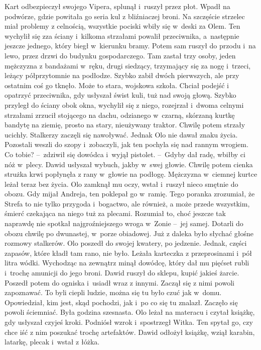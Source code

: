 \documentclass[../MAIN.tex]{subfiles}
\begin{document}
\mm Kart odbezpieczył swojego Vipera, splunął i~ruszył przez płot. Wpadł na
podwórze, gdzie powitała go seria kul z bliźniaczej broni. Na szczęście strzelec
miał problemy z celnością, wszystkie pociski wbiły się w~deski za Olem. Ten
wychylił się zza ściany i~kilkoma strzałami powalił przeciwnika, a~następnie
jeszcze jednego, który biegł w~kierunku bramy. Potem sam ruszył do przodu i~na
lewo, przez drzwi do budynku gospodarczego.
Tam zastał trzy osoby, jeden
mężczyzna z bandażami w~ręku, drugi siedzący, trzymający się za nogę i~trzeci,
leżący półprzytomnie na podłodze. Szybko zabił dwóch pierwszych, ale przy
ostatnim coś go tknęło.
Może to stara, wojskowa szkoła. Chciał podejść i
opatrzyć przeciwnika, gdy usłyszał świst kuli, tuż nad swoją głową. Szybko
przyległ do ściany obok okna, wychylił się z niego, rozejrzał i~dwoma celnymi
strzałami zrzucił stojącego na dachu, odzianego w~czarną, skórzaną kurtkę
bandytę na ziemię, prosto na stary, nieużywany traktor.
\pp
Chwilę potem strzały ucichły. Stalkerzy zaczęli się nawoływać. Jednak Olo nie
dawał znaku życia. Pozostali weszli do szopy i~zobaczyli, jak ten pochyla się
nad rannym wrogiem.
\dd
\sd
\xx
Co tobie? --~zdziwił się dowódca i~wyjął pistolet. --~Gdyby dał radę,
wbiłby ci nóż w~plecy.
\qd
\dd
\mm Dawid usłyszał wybuch, jakby w~swej głowie. Chwilę potem cienka strużka krwi
popłynęła z rany w~głowie na podłogę. Mężczyzna w~ciemnej kurtce leżał teraz bez
życia. Olo zamknął mu oczy, wstał i~ruszył nieco smętnie do obozu. Gdy mijał
Andreja, ten poklepał go w~ramię.
\pp
Tego poranka zrozumiał, że Strefa to nie tylko przygoda i~bogactwo, ale również,
a może przede wszystkim, śmierć czekająca na niego tuż za plecami. Rozumiał to,
choć jeszcze tak naprawdę nie spotkał najgroźniejszego wroga w~Zonie --~jej
samej.
\pp
Dotarli do obozu chwilę po dwunastej, w~porze obiadowej. Już z daleka było
słychać głośne rozmowy stalkerów. Olo poszedł do swojej kwatery, po jedzenie.
Jednak, części zapasów, które kładł tam rano, nie było.
Leżała karteczka z
przeprosinami i~pół litra wódki. Wychodząc na zewnątrz minął dowódcę, który dał
mu pięćset rubli i~trochę amunicji do jego broni.
\pp
Dawid ruszył do sklepu, kupić jakieś żarcie. Poszedł potem do ogniska i~usiadł
wraz z
innymi. Zaczął się z nimi powoli zapoznawać. To byli ciepli ludzie, można się tu
było czuć jak w~domu. Opowiedział, kim jest, skąd pochodzi, jak i~po co się tu
znalazł.
\pp
Zaczęło się powoli ściemniać. Była godzina szesnasta. Olo leżał na materacu i
czytał książkę, gdy usłyszał czyjeś kroki. Podniósł wzrok i~spostrzegł Witka.
Ten spytał go, czy chce iść z nim poszukać trochę artefaktów. Dawid odłożył
książkę, wziął karabin, latarkę, plecak i~wstał z łóżka.
\end{document}
